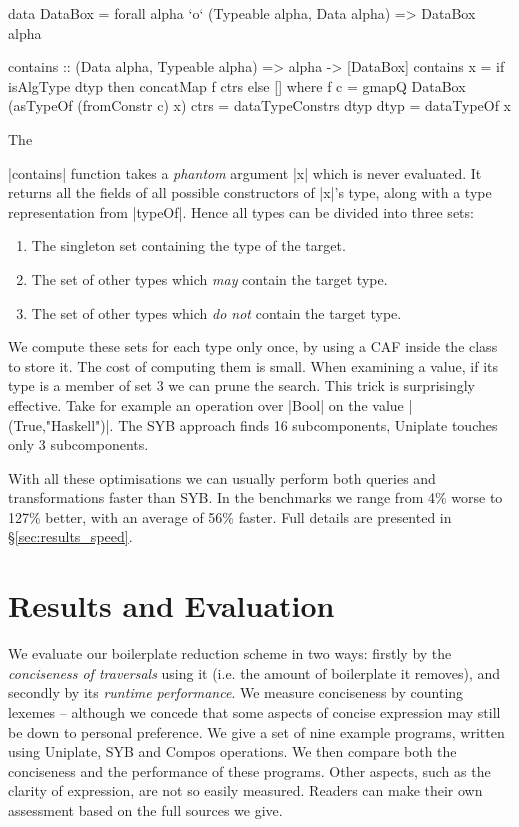 \ignore\begin{code}
data DataBox = forall alpha `o` (Typeable alpha, Data alpha) => DataBox alpha

contains :: (Data alpha, Typeable alpha) => alpha -> [DataBox]
contains x = if isAlgType dtyp then concatMap f ctrs else []
    where
        f c = gmapQ DataBox (asTypeOf (fromConstr c) x)
        ctrs = dataTypeConstrs dtyp
        dtyp = dataTypeOf x
\end{code}

The \ignore|contains| function takes a \textit{phantom} argument |x| which is never evaluated. It returns all the fields of all possible constructors of |x|'s type, along with a type representation from |typeOf|. Hence all types can be divided into three sets:

\begin{enumerate}
\item The singleton set containing the type of the target.
\item The set of other types which \textit{may} contain the target type.
\item The set of other types which \textit{do not} contain the target type.
\end{enumerate}

We compute these sets for each type only once, by using a CAF inside the class to store it. The cost of computing them is small. When examining a value, if its type is a member of set 3 we can prune the search. This trick is surprisingly effective. Take for example an operation over |Bool| on the value |(True,"Haskell")|. The SYB approach finds 16 subcomponents, Uniplate touches only 3 subcomponents.

With all these optimisations we can usually perform both queries and transformations faster than SYB. In the benchmarks we range from 4\% worse to 127\% better, with an average of 56\% faster. Full details are presented in \S\ref{sec:results_speed}.


\section{Results and Evaluation}
\label{sec:results}

We evaluate our boilerplate reduction scheme in two ways: firstly by the \textit{conciseness of traversals} using it (i.e. the amount of boilerplate it removes), and secondly by its \textit{runtime performance}. We measure conciseness by counting lexemes -- although we concede that some aspects of concise expression may still be down to personal preference. We give a set of nine example programs, written using Uniplate, SYB and Compos operations. We then compare both the conciseness and the performance of these programs. Other aspects, such as the clarity of expression, are not so easily measured. Readers can make their own assessment based on the full sources we give.

